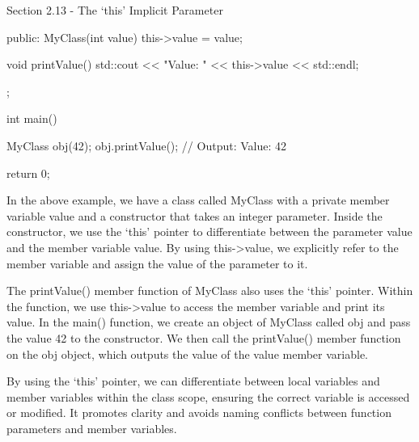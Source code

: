 \begin{notes}{Section 2.13 - The `this' Implicit Parameter}
\begin{highlight}
\begin{code}[C++]
{    public:
        MyClass(int value) {
            this->value = value;
        }
    
        void printValue() {
            std::cout << "Value: " << this->value << std::endl;
        }
    };
    
    int main() {
        MyClass obj(42);
        obj.printValue();  // Output: Value: 42
    
        return 0;
    }
    \end{code}
        In the above example, we have a class called MyClass with a private member variable value and a constructor that takes an integer parameter. Inside the constructor, we use the `this' pointer to differentiate between the parameter value and the member variable value. By using this->value, we explicitly 
        refer to the member variable and assign the value of the parameter to it.
    
        The printValue() member function of MyClass also uses the `this' pointer. Within the function, we use this->value to access the member variable and print its value. In the main() function, we create an object of MyClass called obj and pass the value 42 to the constructor. We then call the 
        printValue() member function on the obj object, which outputs the value of the value member variable.
    
        By using the `this' pointer, we can differentiate between local variables and member variables within the class scope, ensuring the correct variable is accessed or modified. It promotes clarity and avoids naming conflicts between function parameters and member variables.
    \end{highlight}
\end{notes}

